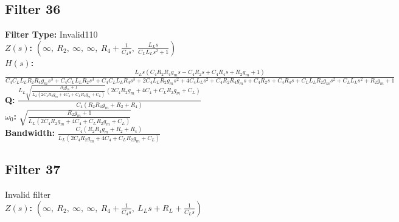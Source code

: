 \documentclass{article}
\begin{document}
\subsection*{Filter 36}
\textbf{Filter Type:} Invalid110 \\ 
\textbf{$Z(s)$:} $\left( \infty, \  R_{2}, \  \infty, \  \infty, \  R_{4} + \frac{1}{C_{4} s}, \  \frac{L_{L} s}{C_{L} L_{L} s^{2} + 1}\right)$ \\ 
\textbf{$H(s)$:} $\frac{L_{L} s \left(C_{4} R_{2} R_{4} g_{m} s - C_{4} R_{2} s + C_{4} R_{4} s + R_{2} g_{m} + 1\right)}{C_{4} C_{L} L_{L} R_{2} R_{4} g_{m} s^{3} + C_{4} C_{L} L_{L} R_{2} s^{3} + C_{4} C_{L} L_{L} R_{4} s^{3} + 2 C_{4} L_{L} R_{2} g_{m} s^{2} + 4 C_{4} L_{L} s^{2} + C_{4} R_{2} R_{4} g_{m} s + C_{4} R_{2} s + C_{4} R_{4} s + C_{L} L_{L} R_{2} g_{m} s^{2} + C_{L} L_{L} s^{2} + R_{2} g_{m} + 1}$ \\ 
\textbf{Q:} $\frac{L_{L} \sqrt{\frac{R_{2} g_{m} + 1}{L_{L} \left(2 C_{4} R_{2} g_{m} + 4 C_{4} + C_{L} R_{2} g_{m} + C_{L}\right)}} \left(2 C_{4} R_{2} g_{m} + 4 C_{4} + C_{L} R_{2} g_{m} + C_{L}\right)}{C_{4} \left(R_{2} R_{4} g_{m} + R_{2} + R_{4}\right)}$ \\ 
\textbf{$\omega_0$:} $\sqrt{\frac{R_{2} g_{m} + 1}{L_{L} \left(2 C_{4} R_{2} g_{m} + 4 C_{4} + C_{L} R_{2} g_{m} + C_{L}\right)}}$ \\ 
\textbf{Bandwidth:} $\frac{C_{4} \left(R_{2} R_{4} g_{m} + R_{2} + R_{4}\right)}{L_{L} \left(2 C_{4} R_{2} g_{m} + 4 C_{4} + C_{L} R_{2} g_{m} + C_{L}\right)}$ \\ 
\subsection*{Filter 37}
Invalid filter \\ 
\textbf{$Z(s)$:} $\left( \infty, \  R_{2}, \  \infty, \  \infty, \  R_{4} + \frac{1}{C_{4} s}, \  L_{L} s + R_{L} + \frac{1}{C_{L} s}\right)$ \\ 
\end{document}
